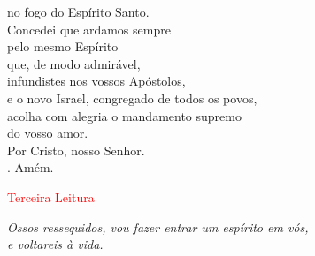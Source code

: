 \documentclass{book}
\begin{document}
\begin{flushleft}
    no fogo do Espírito Santo. \\
    Concedei que ardamos sempre \\
    pelo mesmo Espírito \\
    que, de modo admirável, \\
    infundistes nos vossos Apóstolos, \\
    e o novo Israel, congregado de todos os povos, \\
    acolha com alegria o mandamento supremo \\
    do vosso amor. \\
    Por Cristo, nosso Senhor. \\
    {\color{red} \Rbar.} Amém.
    \vspace{0.2cm} \\

\end{flushleft}

\begin{center}

    \textcolor{red}{Terceira Leitura}

\end{center}

\begin{flushright}
    \textit{Ossos ressequidos, vou fazer entrar um espírito em vós, \\ e voltareis à vida.}
\end{flushright}
\end{document}
